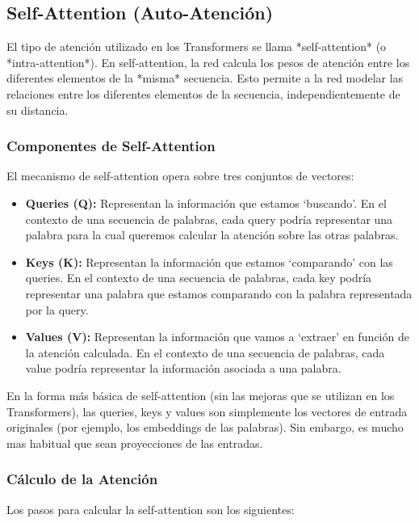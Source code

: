 \documentclass{article}
\begin{document}
\subsection{Self-Attention (Auto-Atención)}

El tipo de atención utilizado en los Transformers se llama *self-attention* (o *intra-attention*).  En self-attention, la red calcula los pesos de atención entre los diferentes elementos de la *misma* secuencia.  Esto permite a la red modelar las relaciones entre los diferentes elementos de la secuencia, independientemente de su distancia.

\subsubsection{Componentes de Self-Attention}

El mecanismo de self-attention opera sobre tres conjuntos de vectores:

\begin{itemize}
    \item \textbf{Queries (Q):}  Representan la información que estamos `buscando'.  En el contexto de una secuencia de palabras, cada query podría representar una palabra para la cual queremos calcular la atención sobre las otras palabras.
    \item \textbf{Keys (K):}  Representan la información que estamos `comparando' con las queries.  En el contexto de una secuencia de palabras, cada key podría representar una palabra que estamos comparando con la palabra representada por la query.
    \item \textbf{Values (V):}  Representan la información que vamos a `extraer' en función de la atención calculada.  En el contexto de una secuencia de palabras, cada value podría representar la información asociada a una palabra.
\end{itemize}

En la forma más básica de self-attention (sin las mejoras que se utilizan en los Transformers), las queries, keys y values son simplemente los vectores de entrada originales (por ejemplo, los embeddings de las palabras). Sin embargo, es mucho mas habitual que sean proyecciones de las entradas.

\subsubsection{Cálculo de la Atención}

Los pasos para calcular la self-attention son los siguientes:
\end{document}
